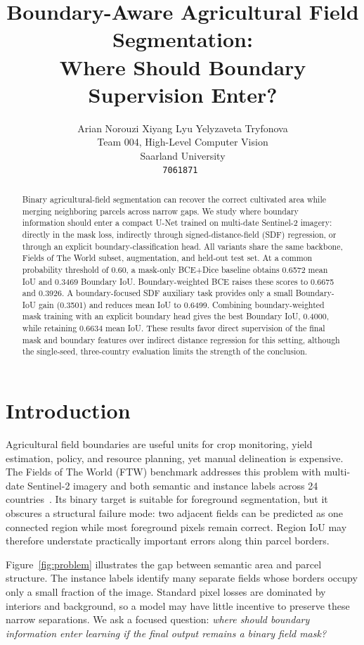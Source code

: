 \documentclass[10pt,twocolumn,letterpaper]{article}
\title{Boundary-Aware Agricultural Field Segmentation:\\
Where Should Boundary Supervision Enter?}
\author{Arian Norouzi \qquad Xiyang Lyu \qquad Yelyzaveta Tryfonova\\
Team 004, High-Level Computer Vision\\
Saarland University\\
{\tt\small 7061871 \qquad 7058370 \qquad 7072789}
\qquad {\small\href{https://github.com/ANorouzi1/final_project/tree/main}{Project code}}}
\begin{document}
\maketitle

\begin{abstract}
Binary agricultural-field segmentation can recover the correct cultivated area while merging neighboring parcels across narrow gaps. We study where boundary information should enter a compact U-Net trained on multi-date Sentinel-2 imagery: directly in the mask loss, indirectly through signed-distance-field (SDF) regression, or through an explicit boundary-classification head. All variants share the same backbone, Fields of The World subset, augmentation, and held-out test set. At a common probability threshold of 0.60, a mask-only BCE+Dice baseline obtains 0.6572 mean IoU and 0.3469 Boundary IoU. Boundary-weighted BCE raises these scores to 0.6675 and 0.3926. A boundary-focused SDF auxiliary task provides only a small Boundary-IoU gain (0.3501) and reduces mean IoU to 0.6499. Combining boundary-weighted mask training with an explicit boundary head gives the best Boundary IoU, 0.4000, while retaining 0.6634 mean IoU. These results favor direct supervision of the final mask and boundary features over indirect distance regression for this setting, although the single-seed, three-country evaluation limits the strength of the conclusion.
\end{abstract}

\section{Introduction}
Agricultural field boundaries are useful units for crop monitoring, yield estimation, policy, and resource planning, yet manual delineation is expensive. The Fields of The World (FTW) benchmark addresses this problem with multi-date Sentinel-2 imagery and both semantic and instance labels across 24 countries~\cite{kerner2025ftw}. Its binary target is suitable for foreground segmentation, but it obscures a structural failure mode: two adjacent fields can be predicted as one connected region while most foreground pixels remain correct. Region IoU may therefore understate practically important errors along thin parcel borders.

Figure~\ref{fig:problem} illustrates the gap between semantic area and parcel structure. The instance labels identify many separate fields whose borders occupy only a small fraction of the image. Standard pixel losses are dominated by interiors and background, so a model may have little incentive to preserve these narrow separations. We ask a focused question: \emph{where should boundary information enter learning if the final output remains a binary field mask?}
\end{document}
